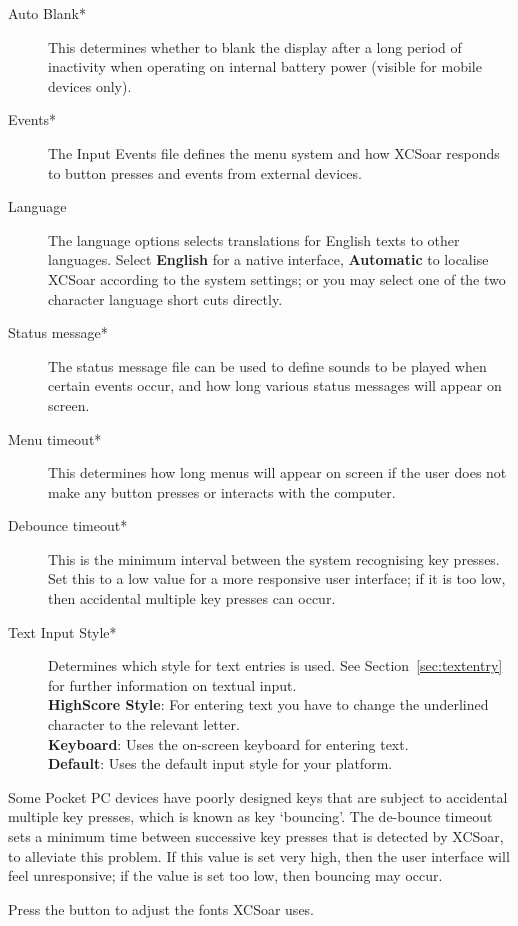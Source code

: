 \begin{description}
\item[Auto Blank*] This determines whether to blank the display after a long
  period of inactivity when operating on internal battery power (visible for mobile 
  devices only).
\item[Events*]  The Input Events file defines the menu system and how XCSoar
  responds to button presses and events from external devices.
\item[Language]  The language options selects translations for English texts to
  other languages.  Select {\bf English} for a native interface, {\bf Automatic}
  to localise XCSoar according to the system settings; or you may select one of 
  the two character language short cuts directly.
\item[Status message*]  The status message file can be used to define sounds to 
  be played when certain events occur, and how long various status messages will 
  appear on screen.
\item[Menu timeout*]  This determines how long menus will appear on screen if the user
  does not make any button presses or interacts with the computer.
\item[Debounce timeout*]  This is the minimum interval between the system 
  recognising key presses.  Set this to a low value for a more responsive user 
  interface; if it is too low, then accidental multiple key presses can occur.
\item[Text Input Style*]  Determines which style for text entries is used. 
  See Section~\ref{sec:textentry} for further information on textual input. \\
  {\bf HighScore Style}: For entering text you have to change the underlined 
  character to the relevant letter. \\
  {\bf Keyboard}: Uses the on-screen keyboard for entering text. \\
  {\bf Default}: Uses the default input style for your platform.
\end{description}

Some Pocket PC devices have poorly designed keys that are subject to
accidental multiple key presses, which is known as key `bouncing'.  The
de-bounce timeout sets a minimum time between successive key presses
that is detected by XCSoar, to alleviate this problem.  If this value
is set very high, then the user interface will feel unresponsive; if
the value is set too low, then bouncing may occur.

Press the  button to adjust the fonts XCSoar uses.


